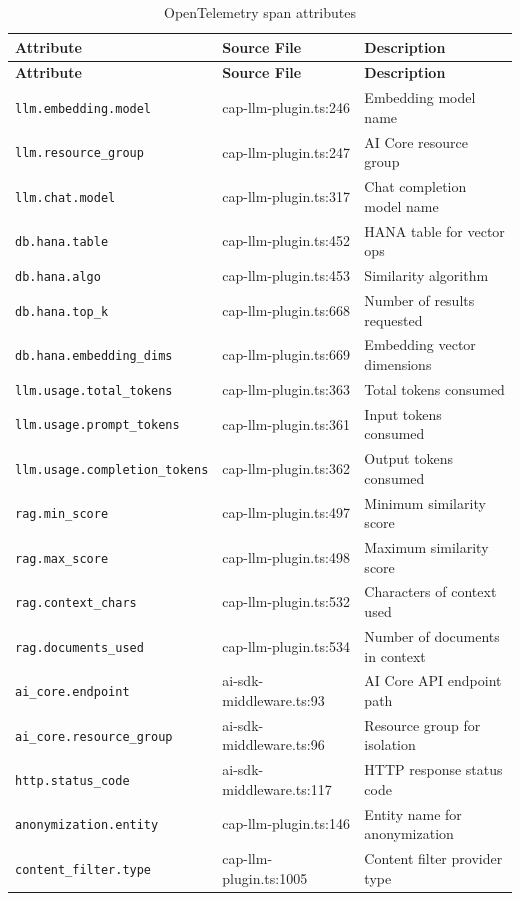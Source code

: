 \documentclass[11pt]{article}
\newcommand{\code}[1]{\texttt{#1}}
\begin{document}
\begin{longtable}{@{}llp{5cm}@{}}
\caption{OpenTelemetry span attributes}
\label{tab:span-attrs} \\
\toprule
\textbf{Attribute} & \textbf{Source File} & \textbf{Description} \\
\midrule
\endfirsthead
\toprule
\textbf{Attribute} & \textbf{Source File} & \textbf{Description} \\
\midrule
\endhead
\bottomrule
\endlastfoot
\code{llm.embedding.model}          & cap-llm-plugin.ts:246  & Embedding model name \\
\code{llm.resource\_group}          & cap-llm-plugin.ts:247  & AI Core resource group \\
\code{llm.chat.model}               & cap-llm-plugin.ts:317  & Chat completion model name \\
\code{db.hana.table}                & cap-llm-plugin.ts:452  & HANA table for vector ops \\
\code{db.hana.algo}                 & cap-llm-plugin.ts:453  & Similarity algorithm \\
\code{db.hana.top\_k}               & cap-llm-plugin.ts:668  & Number of results requested \\
\code{db.hana.embedding\_dims}      & cap-llm-plugin.ts:669  & Embedding vector dimensions \\
\code{llm.usage.total\_tokens}      & cap-llm-plugin.ts:363  & Total tokens consumed \\
\code{llm.usage.prompt\_tokens}     & cap-llm-plugin.ts:361  & Input tokens consumed \\
\code{llm.usage.completion\_tokens} & cap-llm-plugin.ts:362  & Output tokens consumed \\
\code{rag.min\_score}               & cap-llm-plugin.ts:497  & Minimum similarity score \\
\code{rag.max\_score}               & cap-llm-plugin.ts:498  & Maximum similarity score \\
\code{rag.context\_chars}           & cap-llm-plugin.ts:532  & Characters of context used \\
\code{rag.documents\_used}          & cap-llm-plugin.ts:534  & Number of documents in context \\
\code{ai\_core.endpoint}            & ai-sdk-middleware.ts:93 & AI Core API endpoint path \\
\code{ai\_core.resource\_group}     & ai-sdk-middleware.ts:96 & Resource group for isolation \\
\code{http.status\_code}            & ai-sdk-middleware.ts:117 & HTTP response status code \\
\code{anonymization.entity}         & cap-llm-plugin.ts:146  & Entity name for anonymization \\
\code{content\_filter.type}         & cap-llm-plugin.ts:1005 & Content filter provider type \\
\end{longtable}
\end{document}
